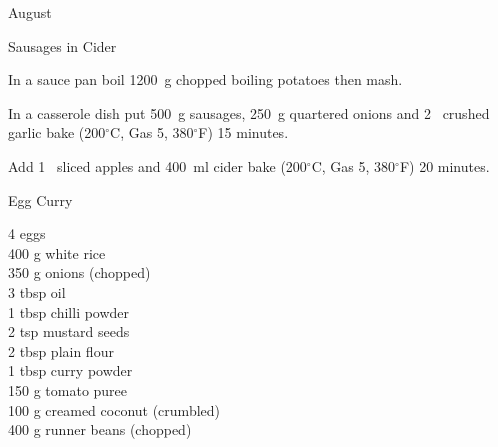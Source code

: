 \begin{menu}{August}
\begin{recipe}{2}{Sausages in Cider}
\begin{ingredients}
		\end{ingredients}
	
	
    \begin{instructions}
    \item 
        In a sauce pan boil
        1200~g chopped boiling potatoes
        then mash.
      \item 
        In a casserole dish put
        500~g  sausages,
        250~g quartered onions
        and
        2~ crushed garlic
        bake (200$^{\circ}$C, Gas 5, 380$^{\circ}$F) 15 minutes.
      \item 
        Add 1~ sliced apples
        and
        400~ml  cider
        bake (200$^{\circ}$C, Gas 5, 380$^{\circ}$F) 20 minutes.
      
    \end{instructions}
    \end{recipe}%
  
    \begin{recipe}{2}{Egg Curry}%
		\begin{ingredients}
		4  eggs  \\
	400 g white rice  \\
	350 g onions (chopped) \\
	3 tbsp oil  \\
	1 tbsp chilli powder  \\
	2 tsp mustard seeds  \\
	2 tbsp plain flour  \\
	1 tbsp curry powder  \\
	150 g tomato puree  \\
	100 g creamed coconut (crumbled) \\
	400 g runner beans (chopped) \\
	
		\end{ingredients}
	
	
	

\end{recipe}
\end{menu}

